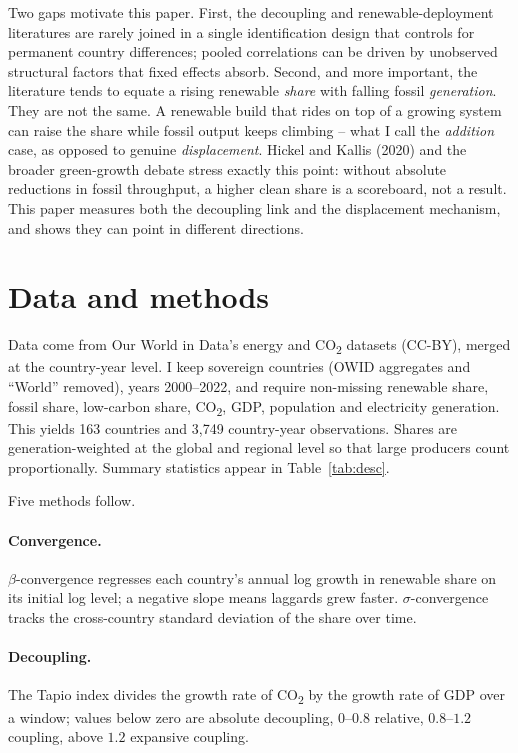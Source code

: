 \documentclass[11pt]{article}
\begin{document}
Two gaps motivate this paper. First, the decoupling and renewable-deployment literatures are rarely joined in a single identification design that controls for permanent country differences; pooled correlations can be driven by unobserved structural factors that fixed effects absorb. Second, and more important, the literature tends to equate a rising renewable \emph{share} with falling fossil \emph{generation}. They are not the same. A renewable build that rides on top of a growing system can raise the share while fossil output keeps climbing -- what I call the \emph{addition} case, as opposed to genuine \emph{displacement}. Hickel and Kallis (2020) and the broader green-growth debate stress exactly this point: without absolute reductions in fossil throughput, a higher clean share is a scoreboard, not a result. This paper measures both the decoupling link and the displacement mechanism, and shows they can point in different directions.

\section{Data and methods}
Data come from Our World in Data's energy and CO\textsubscript{2} datasets (CC-BY), merged at the country-year level. I keep sovereign countries (OWID aggregates and ``World'' removed), years 2000--2022, and require non-missing renewable share, fossil share, low-carbon share, CO\textsubscript{2}, GDP, population and electricity generation. This yields 163 countries and 3,749 country-year observations. Shares are generation-weighted at the global and regional level so that large producers count proportionally. Summary statistics appear in Table~\ref{tab:desc}.

Five methods follow.
\paragraph{Convergence.} $\beta$-convergence regresses each country's annual log growth in renewable share on its initial log level; a negative slope means laggards grew faster. $\sigma$-convergence tracks the cross-country standard deviation of the share over time.
\paragraph{Decoupling.} The Tapio index divides the growth rate of CO\textsubscript{2} by the growth rate of GDP over a window; values below zero are absolute decoupling, $0$--$0.8$ relative, $0.8$--$1.2$ coupling, above $1.2$ expansive coupling.
\end{document}

